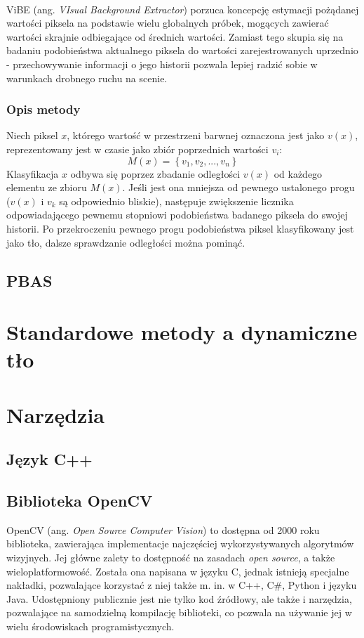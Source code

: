 \paragraph{}
ViBE (ang. \textit{VIsual Background Extractor}) porzuca koncepcję estymacji pożądanej wartości piksela na podstawie wielu globalnych próbek, mogących zawierać wartości skrajnie odbiegające od średnich wartości. Zamiast tego skupia się na badaniu podobieństwa aktualnego piksela do wartości zarejestrowanych uprzednio - przechowywanie informacji o jego historii pozwala lepiej radzić sobie w warunkach drobnego ruchu na scenie.
\subsubsection{Opis metody}
Niech piksel $x$, którego wartość w przestrzeni barwnej oznaczona jest jako $v(x)$, reprezentowany jest w czasie jako zbiór poprzednich wartości $v_{i}$:
\begin{equation}
M(x) = \left\{v_{1}, v_{2}, ..., v_{n}\right\}
\end{equation}
Klasyfikacja $x$ odbywa się poprzez zbadanie odległości $v(x)$ od każdego elementu ze zbioru $M(x)$. Jeśli jest ona mniejsza od pewnego ustalonego progu ($v(x)$ i $v_{k}$ są odpowiednio bliskie), następuje zwiększenie licznika odpowiadającego pewnemu stopniowi podobieństwa badanego piksela do swojej historii. Po przekroczeniu pewnego progu podobieństwa piksel klasyfikowany jest jako tło, dalsze sprawdzanie odległości można pominąć.
\subsection{PBAS}
\cite{hofmann2012background}
\section{Standardowe metody a dynamiczne tło}
\section{Narzędzia}
\subsection{Język C++}
\subsection{Biblioteka OpenCV}

OpenCV (ang. \textit{Open Source Computer Vision}) to dostępna od 2000 roku biblioteka, zawierająca implementacje najczęściej wykorzystywanych algorytmów wizyjnych. Jej główne zalety to dostępność na zasadach \textit{open source}, a także wieloplatformowość. Została ona napisana w języku C, jednak istnieją specjalne nakładki, pozwalające korzystać z niej także m. in. w C++, C\#, Python i języku Java. Udostępniony publicznie jest nie tylko kod źródłowy, ale także i narzędzia, pozwalające na samodzielną kompilację biblioteki, co pozwala na używanie jej w wielu środowiskach programistycznych.
